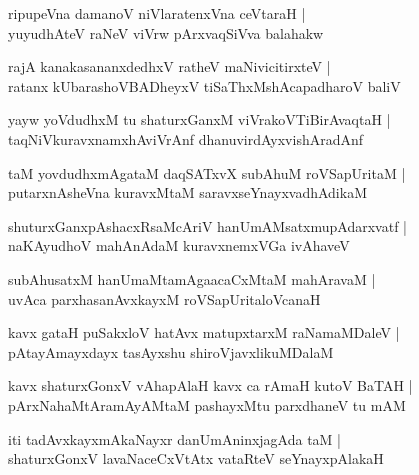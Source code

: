 \documentclass[twoside,12pt,openright]{book}
\newcounter{shloka}[chapter]
\begin{document}
\begin{shloka}%
ripupeVna damanoV niVlaratenxVna ceVtaraH |\\
yuyudhAteV raNeV viVrw pArxvaqSiVva balahakw 
\end{shloka}

\begin{shloka}%
rajA kanakasananxdedhxV ratheV maNivicitirxteV |\\
ratanx kUbarashoVBADheyxV tiSaThxMshAcapadharoV baliV 
\end{shloka}

\begin{shloka}%
yayw yoVdudhxM tu shaturxGanxM viVrakoVTiBirAvaqtaH |\\
taqNiVkuravxnamxhAviVrAnf dhanuvirdAyxvishAradAnf 
\end{shloka}

\begin{shloka}%
taM yovdudhxmAgataM daqSATxvX subAhuM roVSapUritaM |\\
putarxnAsheVna kuravxMtaM saravxseYnayxvadhAdikaM 
\end{shloka}

\begin{shloka}%
shuturxGanxpAshacxRsaMcAriV hanUmAMsatxmupAdarxvatf |\\
naKAyudhoV mahAnAdaM kuravxnemxVGa ivAhaveV
\end{shloka}

\begin{shloka}%
subAhusatxM hanUmaMtamAgaacaCxMtaM mahAravaM |\\
uvAca parxhasanAvxkayxM roVSapUritaloVcanaH
\end{shloka}

\begin{shloka}%
kavx gataH puSakxloV hatAvx matupxtarxM raNamaMDaleV |\\
pAtayAmayxdayx tasAyxshu shiroVjavxlikuMDalaM 
\end{shloka}

\begin{shloka}%
kavx shaturxGonxV vAhapAlaH kavx ca rAmaH kutoV BaTAH |\\
pArxNahaMtAramAyAMtaM pashayxMtu parxdhaneV tu mAM 
\end{shloka}

\begin{shloka}%
iti tadAvxkayxmAkaNayxr danUmAninxjagAda taM |\\
shaturxGonxV lavaNaceCxVtAtx vataRteV seYnayxpAlakaH 
\end{shloka}
\end{document}
